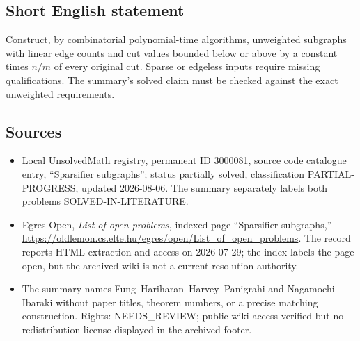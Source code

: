 \documentclass[11pt]{article}
\begin{document}
\subsection{Short English statement}
Construct, by combinatorial polynomial-time algorithms, unweighted subgraphs with linear edge counts and cut values bounded below or above by a constant times $n/m$ of every original cut. Sparse or edgeless inputs require missing qualifications. The summary's solved claim must be checked against the exact unweighted requirements.
\subsection{Sources}
\begin{itemize}
\item Local UnsolvedMath registry, permanent ID 3000081, source code catalogue entry, ``Sparsifier subgraphs''; status partially solved, classification PARTIAL-PROGRESS, updated 2026-08-06. The summary separately labels both problems SOLVED-IN-LITERATURE.
\item Egres Open, \emph{List of open problems}, indexed page ``Sparsifier subgraphs,'' \url{https://oldlemon.cs.elte.hu/egres/open/List_of_open_problems}. The record reports HTML extraction and access on 2026-07-29; the index labels the page open, but the archived wiki is not a current resolution authority.
\item The summary names Fung--Hariharan--Harvey--Panigrahi and Nagamochi--Ibaraki without paper titles, theorem numbers, or a precise matching construction. Rights: NEEDS\_REVIEW; public wiki access verified but no redistribution license displayed in the archived footer.
\end{itemize}
\end{document}
